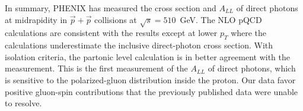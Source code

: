 \documentclass[twocolumn,letterpaper,aps,prl,longbibliography,superscriptaddress,floatfix]{revtex4-2}
\newcommand{\pT}{\mbox{$p_T$}\xspace}
\newcommand{\ALL}{\mbox{$A_{LL}$}\xspace}
\begin{document}

In summary, PHENIX has measured the cross section and \ALL of direct 
photons at midrapidity in $\vec{p}+\vec{p}$ collisions at 
$\sqrt{s}=510$~GeV. The NLO pQCD calculations are consistent with the 
results except at lower \pT where the calculations underestimate the 
inclusive direct-photon cross section. With isolation criteria, the 
partonic level calculation is in better agreement with the measurement. 
This is the first measurement of the \ALL of direct photons, which is 
sensitive to the polarized-gluon distribution inside the proton.
Our data favor positive gluon-spin contributions that the previously
published data were unable to resolve.


\end{document}
